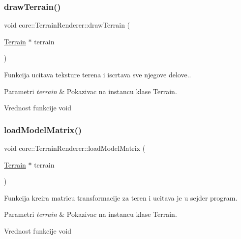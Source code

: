 \subsubsection{\texorpdfstring{draw\+Terrain()}{drawTerrain()}}
{\footnotesize\ttfamily void core\+::\+Terrain\+Renderer\+::draw\+Terrain (\begin{DoxyParamCaption}\item[{\hyperlink{classterrain_1_1Terrain}{Terrain} $\ast$}]{terrain }\end{DoxyParamCaption})}



Funkcija ucitava teksture terena i iscrtava sve njegove delove.. 


\begin{DoxyParams}{Parametri}
{\em terrain} & Pokazivac na instancu klase Terrain. \\
\hline
\end{DoxyParams}
\begin{DoxyReturn}{Vrednost funkcije}
void 
\end{DoxyReturn}
\mbox{\label{classcore_1_1TerrainRenderer_a5e1837566f4de6e49dbf19e203cc9563}} 
\subsubsection{\texorpdfstring{load\+Model\+Matrix()}{loadModelMatrix()}}
{\footnotesize\ttfamily void core\+::\+Terrain\+Renderer\+::load\+Model\+Matrix (\begin{DoxyParamCaption}\item[{\hyperlink{classterrain_1_1Terrain}{Terrain} $\ast$}]{terrain }\end{DoxyParamCaption})}



Funkcija kreira matricu transformacije za teren i ucitava je u sejder program. 


\begin{DoxyParams}{Parametri}
{\em terrain} & Pokazivac na instancu klase Terrain. \\
\hline
\end{DoxyParams}
\begin{DoxyReturn}{Vrednost funkcije}
void 
\end{DoxyReturn}
\mbox{\label{classcore_1_1TerrainRenderer_a1f2aaf851e780fc8f78aa5bb3cd1b512}} 
